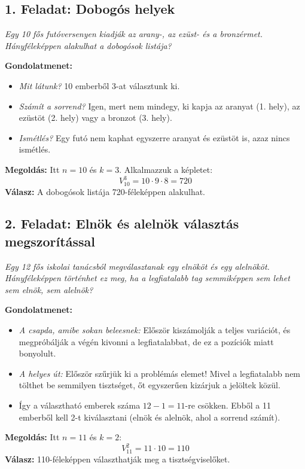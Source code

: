 \documentclass[11pt,a4paper]{article}
\begin{document}
\subsection*{1. Feladat: Dobogós helyek}
\textit{Egy 10 fős futóversenyen kiadják az arany-, az ezüst- és a bronzérmet. Hányféleképpen alakulhat a dobogósok listája?}

\noindent\textbf{Gondolatmenet:}
\begin{itemize}
    \item \emph{Mit látunk?} 10 emberből 3-at választunk ki.
    \item \emph{Számít a sorrend?} Igen, mert nem mindegy, ki kapja az aranyat (1. hely), az ezüstöt (2. hely) vagy a bronzot (3. hely).
    \item \emph{Ismétlés?} Egy futó nem kaphat egyszerre aranyat és ezüstöt is, azaz nincs ismétlés.
\end{itemize}
\noindent\textbf{Megoldás:} Itt $n=10$ és $k=3$. Alkalmazzuk a képletet:
\[
V_{10}^{3} = 10 \cdot 9 \cdot 8 = 720
\]
\textbf{Válasz:} A dobogósok listája 720-féleképpen alakulhat.

\subsection*{2. Feladat: Elnök és alelnök választás megszorítással}
\textit{Egy 12 fős iskolai tanácsból megválasztanak egy elnököt és egy alelnököt. Hányféleképpen történhet ez meg, ha a legfiatalabb tag semmiképpen sem lehet sem elnök, sem alelnök?}

\noindent\textbf{Gondolatmenet:}
\begin{itemize}
    \item \emph{A csapda, amibe sokan beleesnek:} Először kiszámolják a teljes variációt, és megpróbálják a végén kivonni a legfiatalabbat, de ez a pozíciók miatt bonyolult.
    \item \emph{A helyes út:} Először szűrjük ki a problémás elemet! Mivel a legfiatalabb nem tölthet be semmilyen tisztséget, őt egyszerűen kizárjuk a jelöltek közül.
    \item Így a választható emberek száma $12 - 1 = 11$-re csökken. Ebből a 11 emberből kell 2-t kiválasztani (elnök és alelnök, ahol a sorrend számít).
\end{itemize}
\noindent\textbf{Megoldás:} Itt $n=11$ és $k=2$:
\[
V_{11}^{2} = 11 \cdot 10 = 110
\]
\textbf{Válasz:} 110-féleképpen választhatják meg a tisztségviselőket.
\end{document}

